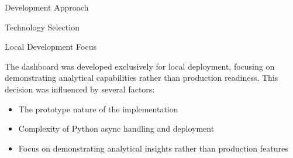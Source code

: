 \begin{section}{Development Approach}
\begin{subsection}{Technology Selection}
	\end{subsection}

	\begin{subsection}{Local Development Focus}
		\label{subsec:implementation-development-approach-local}

		The dashboard was developed exclusively for local deployment, focusing on demonstrating analytical capabilities rather than production readiness. This decision was influenced by several factors:

		\begin{itemize}
			\item The prototype nature of the implementation
			\item Complexity of Python async handling and deployment
			\item Focus on demonstrating analytical insights rather than production features
		\end{itemize}

	\end{subsection}
\end{section}

